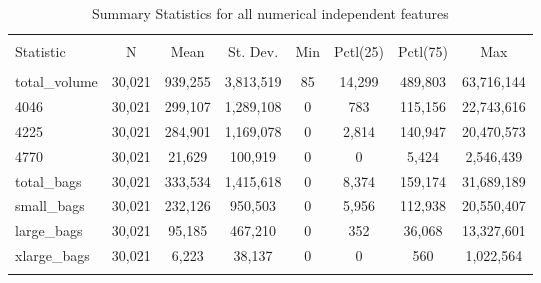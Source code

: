 \documentclass[11pt]{article}\usepackage[]{graphicx}\usepackage[]{color}
\begin{document}
\begin{center}

\begin{table}[H] \centering 
  \caption{Summary Statistics for all numerical independent features} 
  \label{} 
\begin{tabular}{@{\extracolsep{5pt}}lccccccc} 
\\[-1.8ex]\hline 
\hline \\[-1.8ex] 
Statistic & \multicolumn{1}{c}{N} & \multicolumn{1}{c}{Mean} & \multicolumn{1}{c}{St. Dev.} & \multicolumn{1}{c}{Min} & \multicolumn{1}{c}{Pctl(25)} & \multicolumn{1}{c}{Pctl(75)} & \multicolumn{1}{c}{Max} \\ 
\hline \\[-1.8ex] 
total\_volume & 30,021 & 939,255 & 3,813,519 & 85 & 14,299 & 489,803 & 63,716,144 \\ 
4046 & 30,021 & 299,107 & 1,289,108 & 0 & 783 & 115,156 & 22,743,616 \\ 
4225 & 30,021 & 284,901 & 1,169,078 & 0 & 2,814 & 140,947 & 20,470,573 \\ 
4770 & 30,021 & 21,629 & 100,919 & 0 & 0 & 5,424 & 2,546,439 \\ 
total\_bags & 30,021 & 333,534 & 1,415,618 & 0 & 8,374 & 159,174 & 31,689,189 \\ 
small\_bags & 30,021 & 232,126 & 950,503 & 0 & 5,956 & 112,938 & 20,550,407 \\ 
large\_bags & 30,021 & 95,185 & 467,210 & 0 & 352 & 36,068 & 13,327,601 \\ 
xlarge\_bags & 30,021 & 6,223 & 38,137 & 0 & 0 & 560 & 1,022,564 \\ 
\hline \\[-1.8ex] 
\end{tabular} 
\end{table} 

\end{center}
\end{document}
